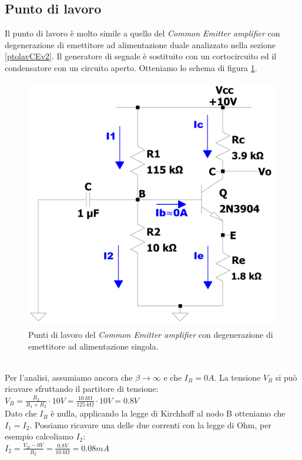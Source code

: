 \documentclass{report}
\begin{document}
\subsection{Punto di lavoro} \label{CEv3_plcap}
Il punto di lavoro è molto simile a quello del \textit{Common Emitter amplifier} con degenerazione di emettitore ad alimentazione duale analizzato nella sezione \ref{ptolavCEv2}. Il generatore di segnale è sostituito con un cortocircuito ed il condensatore con un circuito aperto. Otteniamo lo schema di figura \ref{figura:CEv3_pl}.
\begin{figure}[h]
\centering
\includegraphics[height=11cm]{immagini/CEv3_pl}
\caption{Punti di lavoro del \textit{Common Emitter amplifier} con degenerazione di emettitore ad alimentazione singola.}
\label{figura:CEv3_pl}
\end{figure}
\\Per l'analisi, assumiamo ancora che $\displaystyle{\beta\rightarrow\infty}$ e che $I_{B}=0A$. La tensione $V_B$ si può ricavare sfruttando il partitore di tensione: %
\\[2pt]\indent$\displaystyle{V_B=\frac{R_2}{R_1+R_2}\cdot 10V=\frac{\SI{10}{k\ohm}}{\SI{125}{k\ohm}}\cdot 10V=0.8V}$
\\[2pt]Dato che $I_B$ è nulla, applicando la legge di Kirchhoff al nodo B otteniamo che $I_1=I_2$. Possiamo ricavare una delle due correnti con la legge di Ohm, per esempio calcoliamo $I_2$:
\\[2pt]\indent$\displaystyle{I_2=\frac{V_B-0V}{R_2}=\frac{0.8V}{\SI{10}{k\ohm}}=0.08mA}$
\end{document}
